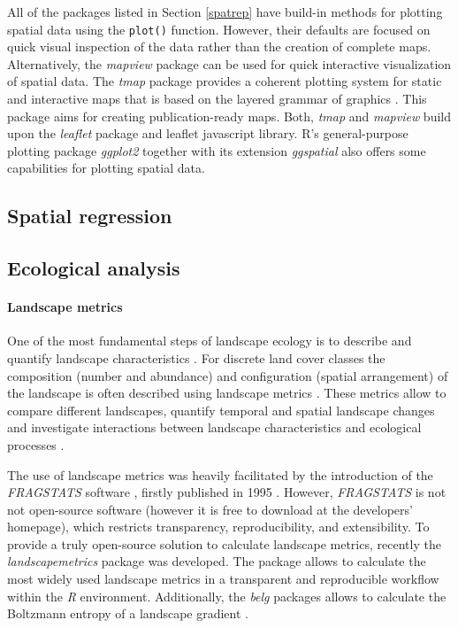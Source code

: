 \documentclass[smallextended]{svjour3}       %
\begin{document}
All of the packages listed in Section \ref{spatrep} have build-in methods for plotting spatial data using the \texttt{plot()} function.
However, their defaults are focused on quick visual inspection of the data rather than the creation of complete maps.
Alternatively, the \emph{mapview} package can be used for quick interactive visualization of spatial data.
The \emph{tmap} package provides a coherent plotting system for static and interactive maps that is based on the layered grammar of graphics \cite{Tennekes2018}.
This package aims for creating publication-ready maps.
Both, \emph{tmap} and \emph{mapview} build upon the \emph{leaflet} package and leaflet javascript library.
R's general-purpose plotting package \emph{ggplot2} together with its extension \emph{ggspatial} also offers some capabilities for plotting spatial data.

\hypertarget{spatial-regression}{%
\subsection{Spatial regression}\label{spatial-regression}}

\hypertarget{sec:ecological_analysis}{%
\subsection{Ecological analysis}\label{sec:ecological_analysis}}

\hypertarget{sec:landscape_metrics}{%
\paragraph{Landscape metrics}\label{sec:landscape_metrics}}

One of the most fundamental steps of landscape ecology is to describe and quantify landscape characteristics \cite{Turner2005,Lausch2015}.
For discrete land cover classes the composition (number and abundance) and configuration (spatial arrangement) of the landscape is often described using landscape metrics \cite{Gustafson1998,Uuemaa2009,Uuemaa2013,Gustafson2019}.
These metrics allow to compare different landscapes, quantify temporal and spatial landscape changes and investigate interactions between landscape characteristics and ecological processes \cite{Uuemaa2009}.

The use of landscape metrics was heavily facilitated by the introduction of the \emph{FRAGSTATS} software \cite{McGarigal2012}, firstly published in 1995 \cite{Kupfer2012,Gustafson2019}.
However, \emph{FRAGSTATS} is not not open-source software (however it is free to download at the developers' homepage), which restricts transparency, reproducibility, and extensibility.
To provide a truly open-source solution to calculate landscape metrics, recently the \emph{landscapemetrics} package \cite{Hesselbarth2019a} was developed.
The package allows to calculate the most widely used landscape metrics in a transparent and reproducible workflow within the \emph{R} environment.
Additionally, the \emph{belg} packages allows to calculate the Boltzmann entropy of a landscape gradient \cite{Nowosad2019a}.
\end{document}
